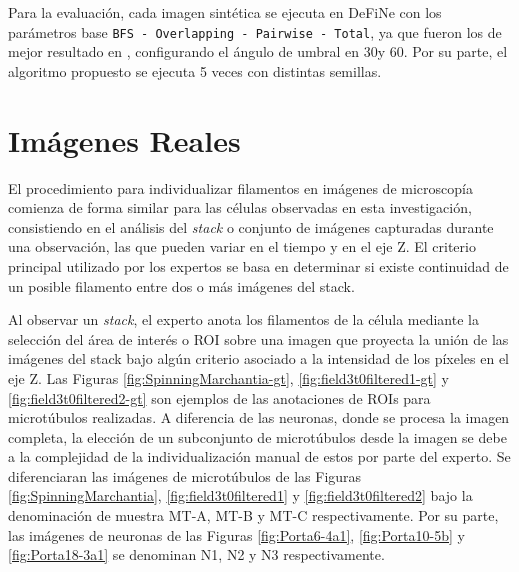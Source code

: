 Para la evaluaci\'on, cada imagen sint\'etica se ejecuta en DeFiNe con los par\'ametros base {\tt BFS - Overlapping - Pairwise - Total}, ya que fueron los de mejor resultado en \cite{breuer2015define}, configurando el \'angulo de umbral en 30\textdegree y 60\textdegree. Por su parte, el algoritmo propuesto se ejecuta 5 veces con distintas semillas.

\section{Im\'agenes Reales}
El procedimiento para individualizar filamentos en im\'agenes de microscop\'ia
comienza de forma similar para las c\'elulas observadas en esta investigaci\'on, consistiendo en el an\'alisis del {\it stack} o conjunto de im\'agenes capturadas durante una observaci\'on, las que pueden variar en el tiempo y en el eje Z. El criterio principal utilizado por los expertos se basa en determinar si existe continuidad de un posible filamento entre dos o m\'as im\'agenes del stack. %

Al observar un {\it stack}, el experto anota los filamentos de la c\'elula mediante la selecci\'on del \'area de inter\'es o ROI sobre una imagen que proyecta la uni\'on de las im\'agenes del stack bajo alg\'un criterio asociado a la intensidad de los p\'ixeles en el eje Z. Las Figuras \ref{fig:SpinningMarchantia-gt}, \ref{fig:field3t0filtered1-gt} y \ref{fig:field3t0filtered2-gt} son ejemplos de las anotaciones de ROIs para microt\'ubulos realizadas. A diferencia de las neuronas, donde se procesa la imagen completa, la elecci\'on de un subconjunto de microt\'ubulos desde la imagen se debe a la complejidad de la individualizaci\'on manual de estos por parte del experto. Se diferenciaran las im\'agenes de microt\'ubulos de las Figuras \ref{fig:SpinningMarchantia}, \ref{fig:field3t0filtered1} y \ref{fig:field3t0filtered2} bajo la denominaci\'on de muestra MT-A, MT-B y MT-C respectivamente. Por su parte, las im\'agenes de neuronas de las Figuras \ref{fig:Porta6-4a1}, \ref{fig:Porta10-5b} y \ref{fig:Porta18-3a1}  se denominan N1, N2 y N3 respectivamente.

